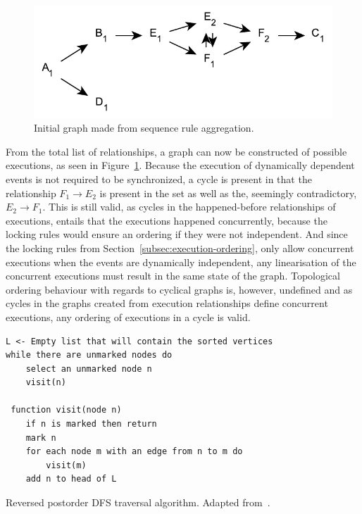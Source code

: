 \documentclass{article}
\begin{document}
	\begin{figure}[ht]
		\center
		\includegraphics[scale=0.6]{figures/dcr-graphs/execution-sequence-graph-example.pdf}
		\caption{Initial graph made from sequence rule aggregation.}
		\label{fig:execution-sequence-graph-example}
	\end{figure}
    \FloatBarrier

	From the total list of relationships, a graph can now be constructed of possible executions, as seen in Figure~\ref{fig:execution-sequence-graph-example}.
	Because the execution of dynamically dependent events is not required to be synchronized, a cycle is present in that the relationship $F_1 \rightarrow E_2$ is present in the set as well as the, seemingly contradictory, $E_2 \rightarrow F_1$.
	This is still valid, as cycles in the happened-before relationships of executions, entails that the executions happened concurrently, because the locking rules would ensure an ordering if they were not independent.
	And since the locking rules from Section~\ref{subsec:execution-ordering}, only allow concurrent executions when the events are dynamically independent, any linearisation of the concurrent executions must result in the same state of the graph.
	Topological ordering behaviour with regards to cyclical graphs is, however, undefined and as cycles in the graphs created from execution relationships define concurrent executions, any ordering of executions in a cycle is valid.
\begin{snippet}
\begin{mdframed}[backgroundcolor=Papyrus]
	\begin{lstlisting}[style=pseudo, keywords={}]
L <- Empty list that will contain the sorted vertices
while there are unmarked nodes do
    select an unmarked node n
    visit(n)

 function visit(node n)
    if n is marked then return
    mark n
    for each node m with an edge from n to m do
        visit(m)
    add n to head of L
	\end{lstlisting}
\end{mdframed}
\caption{Reversed postorder DFS traversal algorithm. Adapted from~\cite{_topological_2018}.}
\label{lst:dfs-traversal}
\end{snippet}
\FloatBarrier
\end{document}
